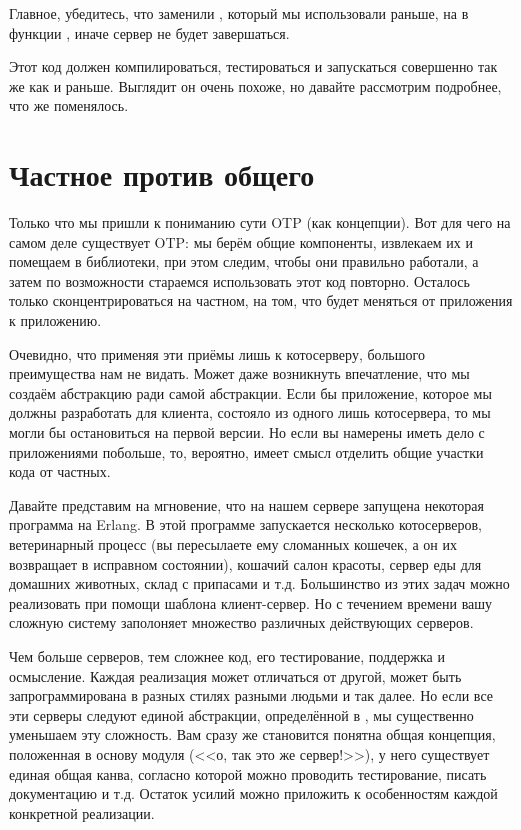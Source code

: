 Главное, убедитесь, что заменили , который мы использовали раньше, на  в функции , иначе сервер не будет завершаться.

Этот код должен компилироваться, тестироваться и запускаться совершенно так же как и раньше.
Выглядит он очень похоже, но давайте рассмотрим подробнее, что же поменялось.
\section{Частное против общего}
\label{specific-vs-generic}
Только что мы пришли к пониманию сути OTP (как концепции).
Вот для чего на самом деле существует OTP: мы берём общие компоненты, извлекаем их и помещаем в библиотеки, при этом следим, чтобы они правильно работали, а затем по возможности стараемся использовать этот код повторно.
Осталось только сконцентрироваться на частном, на том, что будет меняться от приложения к приложению.

Очевидно, что применяя эти приёмы лишь к котосерверу, большого преимущества нам не видать.
Может даже возникнуть впечатление, что мы создаём абстракцию ради самой абстракции.
Если бы приложение, которое мы должны разработать для клиента, состояло из одного лишь котосервера, то мы могли бы остановиться на первой версии.
Но если вы намерены иметь дело с приложениями побольше, то, вероятно, имеет смысл отделить общие участки кода от частных.

Давайте представим на мгновение, что на нашем сервере запущена некоторая программа на Erlang.
В этой программе запускается несколько котосерверов, ветеринарный процесс (вы пересылаете ему сломанных кошечек, а он их возвращает в исправном состоянии), кошачий салон красоты, сервер еды для домашних животных, склад с припасами и т.д.
Большинство из этих задач можно реализовать при помощи шаблона клиент\--сервер.
Но с течением времени вашу сложную систему заполоняет множество различных действующих серверов.

Чем больше серверов, тем сложнее код, его тестирование, поддержка и осмысление.
Каждая реализация может отличаться от другой, может быть запрограммирована в разных стилях разными людьми и так далее.
Но если все эти серверы следуют единой абстракции, определённой в , мы существенно уменьшаем эту сложность.
Вам сразу же становится понятна общая концепция, положенная в основу модуля (<<о, так это же сервер!>>), у него существует единая общая канва, согласно которой можно проводить тестирование, писать документацию и т.д.
Остаток усилий можно приложить к особенностям каждой конкретной реализации.

